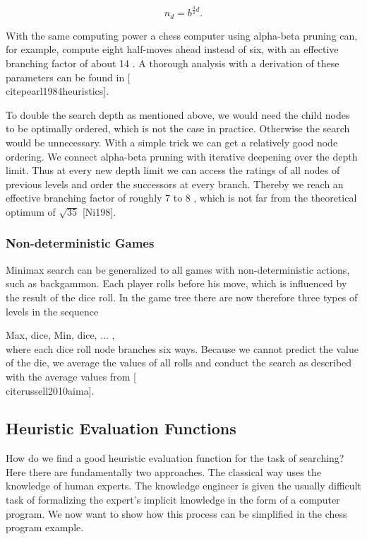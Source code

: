 \documentclass[10pt]{book}
\begin{document}
$$
n_{d}=b^{\frac{3}{4} d} .
$$

With the same computing power a chess computer using alpha-beta pruning can, for example, compute eight half-moves ahead instead of six, with an effective branching factor of about 14 . A thorough analysis with a derivation of these parameters can be found in [\\cite{pearl1984heuristics}].

To double the search depth as mentioned above, we would need the child nodes to be optimally ordered, which is not the case in practice. Otherwise the search would be unnecessary. With a simple trick we can get a relatively good node ordering. We connect alpha-beta pruning with iterative deepening over the depth limit. Thus at every new depth limit we can access the ratings of all nodes of previous levels and order the successors at every branch. Thereby we reach an effective branching factor of roughly 7 to 8 , which is not far from the theoretical optimum of $\sqrt{35}$ [Ni198].

\subsubsection*{Non-deterministic Games}
Minimax search can be generalized to all games with non-deterministic actions, such as backgammon. Each player rolls before his move, which is influenced by the result of the dice roll. In the game tree there are now therefore three types of levels in the sequence

Max, dice, Min, dice, ... ,\\[0pt]
where each dice roll node branches six ways. Because we cannot predict the value of the die, we average the values of all rolls and conduct the search as described with the average values from [\\cite{russell2010aima}].

\subsection*{Heuristic Evaluation Functions}
How do we find a good heuristic evaluation function for the task of searching? Here there are fundamentally two approaches. The classical way uses the knowledge of human experts. The knowledge engineer is given the usually difficult task of formalizing the expert's implicit knowledge in the form of a computer program. We now want to show how this process can be simplified in the chess program example.
\end{document}

